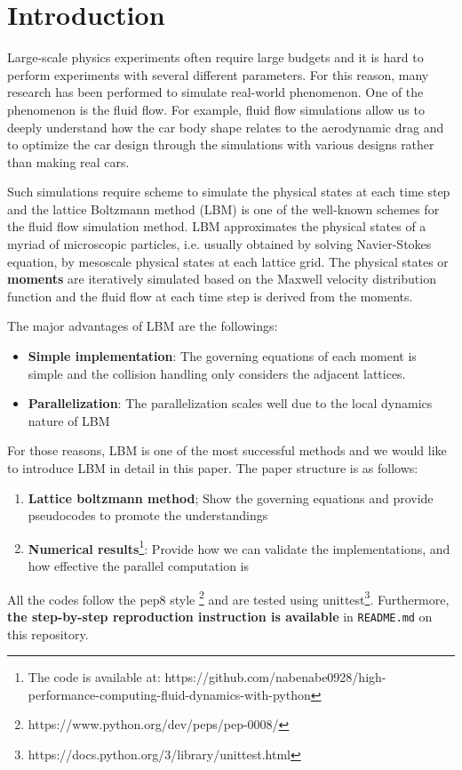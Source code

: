 \chapter{Introduction}
\vspace{-8mm}
Large-scale physics experiments often require large budgets
and it is hard to perform experiments with several different parameters.
For this reason, many research has been performed to simulate real-world 
phenomenon.
One of the phenomenon is the fluid flow.
For example, fluid flow simulations allow us to deeply understand
how the car body shape relates to the aerodynamic drag
and to optimize the car design through the simulations with
various designs rather than making real cars\cite{padagannavar2016automotive}.

Such simulations require scheme to simulate the physical states
at each time step
and the lattice Boltzmann method (LBM) \cite{timm2016lattice}
is one of the well-known
schemes for the fluid flow simulation method.
LBM approximates the physical states of a myriad of microscopic particles,
i.e. usually obtained by solving Navier-Stokes equation,
by mesoscale physical states at each lattice grid.
The physical states or {\bf moments} are iteratively simulated based on
the Maxwell velocity distribution function\cite{huang1963statistical} and
the fluid flow at each time step is derived from the moments.

The major advantages of LBM are the followings:
\begin{itemize}
  \item {\bf Simple implementation}: The governing equations of each moment
  is simple and the collision handling only considers the adjacent lattices. 
  \item {\bf Parallelization}: The parallelization scales well due to
  the local dynamics nature of LBM\cite{raabe2004overview}
\end{itemize}
For those reasons, LBM is one of the most successful methods and
we would like to introduce LBM in detail in this paper.
The paper structure is as follows:
\begin{enumerate}
  \item {\bf Lattice boltzmann method}; Show the governing equations and 
  provide pseudocodes to promote the understandings
  \item {\bf Numerical results}\footnote{
  The code is available at:
    https://github.com/nabenabe0928/high-performance-computing-fluid-dynamics-with-python
  }: Provide how we can validate the implementations,
  and how effective the parallel computation is
\end{enumerate}
All the codes follow the pep8 style
\footnote{https://www.python.org/dev/peps/pep-0008/} and 
are tested using
unittest\footnote{https://docs.python.org/3/library/unittest.html}.
Furthermore, {\bf the step-by-step reproduction instruction is available}
in {\tt README.md} on this repository.

